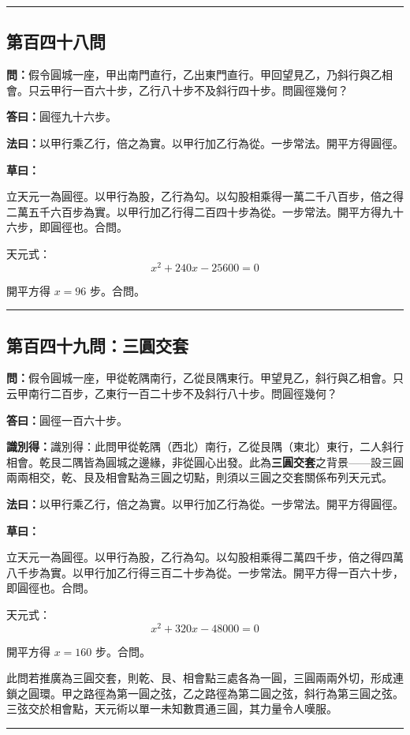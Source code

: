 \documentclass[11pt,a4paper]{article}
\newcommand{\longline}{\noindent\rule{\textwidth}{0.4pt}}
\newcommand{\wen}[1]{\par\noindent\textbf{\textcolor{probcolor}{問：}}{#1}\par}
\newcommand{\da}[1]{\par\noindent\textbf{\textcolor{anscolor}{答曰：}}{#1}\par}
\newcommand{\fayue}[1]{\par\noindent\textbf{\textcolor{methodcolor}{法曰：}}{#1}\par}
\newcommand{\caoyue}[1]{\par\noindent\textbf{草曰：}{#1}\par}
\newcommand{\zhi}[1]{\par\noindent\textbf{識別得：}{#1}\par}
\begin{document}
\vspace{0.5cm}
\longline

\subsection*{第百四十八問}
\wen{假令圓城一座，甲出南門直行，乙出東門直行。甲回望見乙，乃斜行與乙相會。只云甲行一百六十步，乙行八十步不及斜行四十步。問圓徑幾何？}

\da{圓徑九十六步。}

\fayue{以甲行乘乙行，倍之為實。以甲行加乙行為從。一步常法。開平方得圓徑。}

\caoyue{
立天元一為圓徑。以甲行為股，乙行為勾。以勾股相乘得一萬二千八百步，倍之得二萬五千六百步為實。以甲行加乙行得二百四十步為從。一步常法。開平方得九十六步，即圓徑也。合問。

天元式：
$$x^2 + 240x - 25600 = 0$$

開平方得 $x = 96$ 步。合問。
}

\vspace{0.5cm}
\longline

\subsection*{第百四十九問：三圓交套}
\wen{假令圓城一座，甲從乾隅南行，乙從艮隅東行。甲望見乙，斜行與乙相會。只云甲南行二百步，乙東行一百二十步不及斜行八十步。問圓徑幾何？}

\da{圓徑一百六十步。}

\zhi{識別得：此問甲從乾隅（西北）南行，乙從艮隅（東北）東行，二人斜行相會。乾艮二隅皆為圓城之邊緣，非從圓心出發。此為\textbf{三圓交套}之背景——設三圓兩兩相交，乾、艮及相會點為三圓之切點，則須以三圓之交套關係布列天元式。}

\fayue{以甲行乘乙行，倍之為實。以甲行加乙行為從。一步常法。開平方得圓徑。}

\caoyue{
立天元一為圓徑。以甲行為股，乙行為勾。以勾股相乘得二萬四千步，倍之得四萬八千步為實。以甲行加乙行得三百二十步為從。一步常法。開平方得一百六十步，即圓徑也。合問。

天元式：
$$x^2 + 320x - 48000 = 0$$

開平方得 $x = 160$ 步。合問。

此問若推廣為三圓交套，則乾、艮、相會點三處各為一圓，三圓兩兩外切，形成連鎖之圓環。甲之路徑為第一圓之弦，乙之路徑為第二圓之弦，斜行為第三圓之弦。三弦交於相會點，天元術以單一未知數貫通三圓，其力量令人嘆服。
}

\vspace{0.5cm}
\longline
\end{document}
